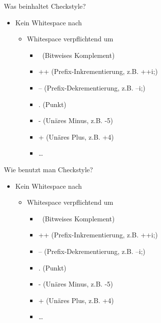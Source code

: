 \documentclass[18pt]{beamer}
\begin{document}
\begin{frame}[fragile]{Was beinhaltet Checkstyle?}
\begin{itemize}

	\item Kein Whitespace nach
	\begin{itemize}
			\item Whitespace verpflichtend um
				\begin{itemize}
				\item $~$ (Bitweises Komplement)
				\item ++ (Prefix-Inkrementierung, z.B. ++i;)
				\item -- (Prefix-Dekrementierung, z.B. --i;)
				\item . (Punkt)
				\item - (Unäres Minus, z.B. -5)
				\item + (Unäres Plus, z.B. +4)
				\item \ldots
				\end{itemize}
	\end{itemize}
\end{itemize}	
\end{frame}


\begin{frame}[fragile]{Wie benutzt man Checkstyle?}
\begin{itemize}

	\item Kein Whitespace nach
	\begin{itemize}
			\item Whitespace verpflichtend um
				\begin{itemize}
				\item $~$ (Bitweises Komplement)
				\item ++ (Prefix-Inkrementierung, z.B. ++i;)
				\item -- (Prefix-Dekrementierung, z.B. --i;)
				\item . (Punkt)
				\item - (Unäres Minus, z.B. -5)
				\item + (Unäres Plus, z.B. +4)
				\item \ldots
				\end{itemize}
	\end{itemize}
\end{itemize}	
\end{frame}
\end{document}
